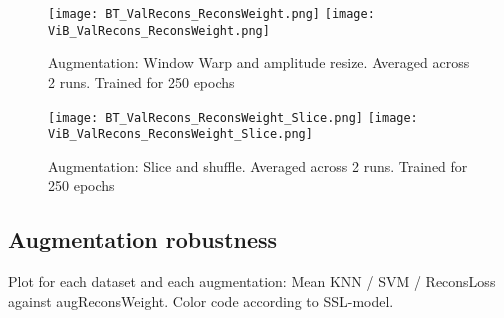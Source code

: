 \documentclass[../../thesis.tex]{subfiles}
\begin{document}
\begin{figure}[h]
    \texttt{[image: BT\_ValRecons\_ReconsWeight.png]}
    \texttt{[image: ViB\_ValRecons\_ReconsWeight.png]}
    \caption{Augmentation: Window Warp and amplitude resize. Averaged across 2 runs. Trained for 250 epochs}  
\end{figure}
\begin{figure}[h]
    \texttt{[image: BT\_ValRecons\_ReconsWeight\_Slice.png]}
    \texttt{[image: ViB\_ValRecons\_ReconsWeight\_Slice.png]}
    \caption{Augmentation: Slice and shuffle. Averaged across 2 runs. Trained for 250 epochs}  
\end{figure}
\subsection{Augmentation robustness}

Plot for each dataset and each augmentation: 
Mean KNN / SVM / ReconsLoss against augReconsWeight. 
Color code according to SSL-model.
\end{document}
